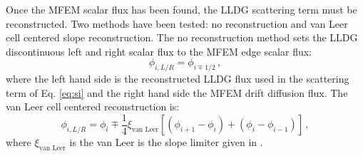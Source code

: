 Once the MFEM scalar flux has been found, the LLDG scattering term must be reconstructed. Two methods have been tested: no reconstruction and van Leer cell centered slope reconstruction. The no reconstruction method sets the LLDG discontinuous left and right scalar flux to the MFEM edge scalar flux: 
	\begin{equation} 
		\phi_{i,L/R} = \phi_{i\mp1/2} \,,
	\end{equation} 
where the left hand side is the reconstructed LLDG flux used in the scattering term of Eq. \ref{eq:si} and the right hand side the MFEM drift diffusion flux. The van Leer cell centered reconstruction is: 
	\begin{equation} 
		\phi_{i,L/R} = \phi_i \mp \frac{1}{4} \xi_\text{van Leer} \left[\left(\phi_{i+1} - \phi_i\right) + \left(\phi_i - \phi_{i-1}\right) \right] \,,
	\end{equation}
where $\xi_\text{van Leer}$ is the van Leer is the slope limiter given in \cite{}. 